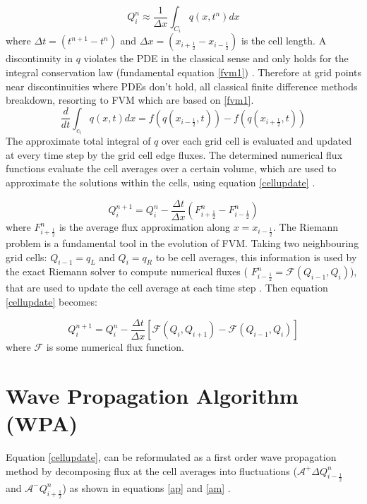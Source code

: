 \documentclass[12pt,a4paper]{article}
\begin{document}
	\begin{equation}
		Q_{i}^{n} \approx \dfrac{1}{\Delta x} \int_{C_{i}}q(x,t^{n})dx
		\label{wpa0}
	\end{equation}
	where $\Delta t = (t^{n+1} - t^{n})$ and  $\Delta x = (x_{i+\frac{1}{2}} - x_{i-\frac{1}{2}})$ is the cell length. A discontinuity in $q$ violates the PDE in the classical sense and only holds for the integral conservation law (fundamental equation \eqref{fvm1}) \cite{leveque2002finite}. Therefore at grid points near discontinuities where PDEs don't hold, all classical finite difference methods breakdown, resorting to FVM which are based on \eqref{fvm1}. 	
	\begin{equation}
		\frac{d}{dt} \int_{c_{i}} q(x,t)dx = f(q(x_{i-\frac{1}{2}},t)) -  f(q(x_{i+\frac{1}{2}},t))
		\label{fvm1}
	\end{equation}	
	The approximate  total integral of $q$ over each grid cell is evaluated and updated at every time step by the grid cell edge fluxes. The determined numerical flux functions evaluate the  cell averages over a certain volume, which are used to approximate the solutions within the cells, using equation \eqref{cellupdate} \cite{le-ge-be:2011}.
	
	\begin{equation}
		Q_{i}^{n+1} = Q_{i}^{n} - \frac{\Delta t}{\Delta x} (F_{i+\frac{1}{2}}^{n} - F_{i-\frac{1}{2}}^{n})
		\label{cellupdate}
	\end{equation}	
	where $F_{i+\frac{1}{2}}^{n} $ is the average flux approximation along $x=x_{i-\frac{1}{2}}$.
	The Riemann problem is a fundamental tool in the evolution of FVM. Taking two neighbouring grid cells: $Q_{i-1} = q_{L}$ and $Q_{i} = q_{R}$ to be cell averages, this information is used by the exact Riemann solver to compute numerical fluxes ( $F_{i-\frac{1}{2}}^{n} = \mathcal{F}(Q_{i-1} , Q_{i} )$), that are used to update the cell average at each time step \cite{ba-le-mi-ro:2003}. Then equation \eqref{cellupdate} becomes:
	
	\begin{equation}
		Q_{i}^{n+1} = Q_{i}^{n} - \frac{\Delta t}{\Delta x} \left[ \mathcal{F}(Q_{i} , Q_{i+1} ) - \mathcal{F}(Q_{i-1} , Q_{i} ) \right]
		\label{cellupdat}
	\end{equation}
	where $\mathcal{F}$ is some numerical flux function.\\
	
	\section{Wave Propagation Algorithm (WPA)}
	Equation \eqref{cellupdate}, can be reformulated as a first order wave propagation method by decomposing flux at the cell averages into fluctuations ($\mathcal{A^{+}}\Delta 	Q_{i-\frac{1}{2}}^{n}$ and  $\mathcal{A^{-}}Q_{i+\frac{1}{2}}^{n}$) as shown in equations \eqref{ap} and \eqref{am} \cite{ma-ah-be-ca-ge-ha-ke-le-le:2016}. 
	
\end{document}
